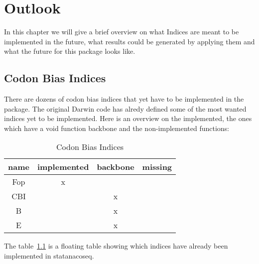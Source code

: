 \chapter{Outlook}
In this chapter we will give a brief overview on what Indices are meant to be implemented in the future, what results could be generated by applying them and what the future for this package looks like. 


\section{Codon Bias Indices}
There are dozens of codon bias indices that yet have to be implemented in the package. The original Darwin code has alredy defined some of the most wanted indices yet to be implemented. 
Here is an overview on the implemented, the ones which have a void function backbone and the non-implemented functions:

\begin{table}[tb]
\caption[Codon Bias Indices]{Codon Bias Indices}
\label{tab:CodonBiasIndices}
\centering
\begin{tabular}{cccc}
\toprule
	name 	& implemented & backbone & missing	  \\ 
\midrule
	Fop	& x	 & & \\
	CBI		& & x &	  \\
	B		& & x &   \\
	E		& & x &	  \\
\bottomrule 
\end{tabular}
\end{table}



The table~\ref{tab:CodonBiasIndices} is a floating table showing which indices have already been implemented in statanacoseq.

